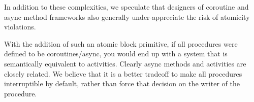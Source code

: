 \documentclass[a4paper,UKenglish,cleveref, autoref]{lipics-v2019}
\begin{document}
In addition to these complexities, we speculate that designers of coroutine and async method frameworks also generally under-appreciate the risk of atomicity violations.

With the addition of such an atomic block primitive, if all procedures were defined to be coroutines/async, you would end up with a system that is semantically equivalent to activities.
Clearly async methods and activities are closely related.
We believe that it is a better tradeoff to make all procedures interruptible by default, rather than force that decision on the writer of the procedure.





\end{document}
